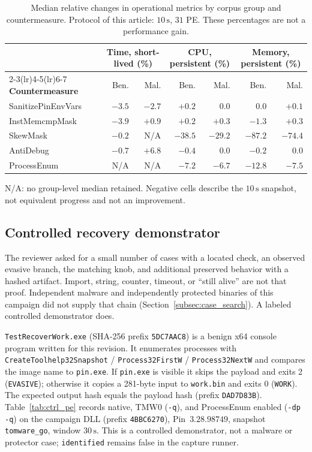 \documentclass[pdflatex,sn-mathphys-num]{sn-jnl}
\theoremstyle{thmstyleone}
\theoremstyle{thmstyletwo}
\theoremstyle{thmstylethree}
\begin{document}
\begin{table}[t]
\caption{Median relative changes in operational metrics by corpus group and countermeasure. Protocol of this article: $10\,\mathrm{s}$, $31$ PE. These percentages are not a performance gain.}
\label{tab:resources}
\centering
\small
\begin{tabular}{lrrrrrr}
\toprule
& \multicolumn{2}{c}{Time, short-lived (\%)} & \multicolumn{2}{c}{CPU, persistent (\%)} & \multicolumn{2}{c}{Memory, persistent (\%)} \\
\cmidrule(lr){2-3}\cmidrule(lr){4-5}\cmidrule(lr){6-7}
\textbf{Countermeasure} & Ben. & Mal. & Ben. & Mal. & Ben. & Mal. \\
\midrule
SanitizePinEnvVars & $-3.5$ & $-2.7$ & $+0.2$ & $0.0$ & $0.0$ & $+0.1$ \\
InstMemcmpMask & $-3.9$ & $+0.9$ & $+0.2$ & $+0.3$ & $-1.3$ & $+0.3$ \\
SkewMask & $-0.2$ & N/A & $-38.5$ & $-29.2$ & $-87.2$ & $-74.4$ \\
AntiDebug & $-0.7$ & $+6.8$ & $-0.4$ & $0.0$ & $-0.2$ & $0.0$ \\
ProcessEnum & N/A & N/A & $-7.2$ & $-6.7$ & $-12.8$ & $-7.5$ \\
\bottomrule
\end{tabular}
\vspace{3pt}
\parbox{\columnwidth}{\footnotesize N/A: no group-level median retained. Negative cells describe the $10\,\mathrm{s}$ snapshot, not equivalent progress and not an improvement.}
\end{table}

\subsection{Controlled recovery demonstrator}
\label{subsec:ctrl_pe}

The reviewer asked for a small number of cases with a located check, an observed evasive branch, the matching knob, and additional preserved behavior with a hashed artifact. Import, string, counter, timeout, or ``still alive'' are not that proof. Independent malware and independently protected binaries of this campaign did not supply that chain (Section~\ref{subsec:case_search}). A labeled controlled demonstrator does.

\texttt{TestRecoverWork.exe} (SHA-256 prefix \texttt{5DC7AAC8}) is a benign x64 console program written for this revision. It enumerates processes with \texttt{CreateToolhelp32Snapshot} / \texttt{Process32FirstW} / \texttt{Process32NextW} and compares the image name to \texttt{pin.exe}. If \texttt{pin.exe} is visible it skips the payload and exits 2 (\texttt{EVASIVE}); otherwise it copies a 281-byte input to \texttt{work.bin} and exits 0 (\texttt{WORK}). The expected output hash equals the payload hash (prefix \texttt{DAD7D83B}). Table~\ref{tab:ctrl_pe} records native, TMW0 (\texttt{-q}), and ProcessEnum enabled (\texttt{-dp -q}) on the campaign DLL (prefix \texttt{4BBC6270}), Pin~$3.28.98749$, snapshot \texttt{tomware\_go}, window $30\,\mathrm{s}$. This is a controlled demonstrator, not a malware or protector case; \texttt{identified} remains false in the capture runner.
\end{document}
